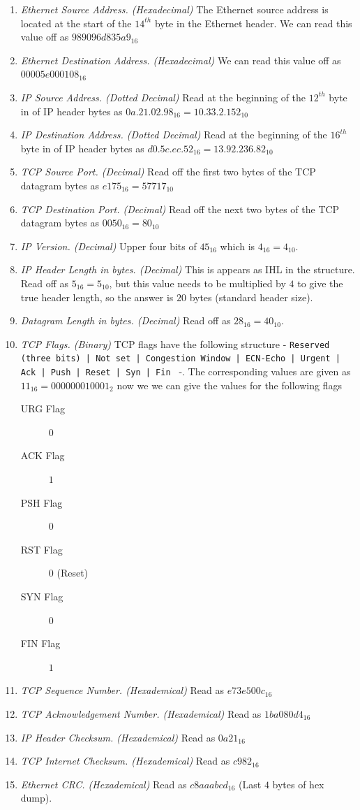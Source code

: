\documentclass{article}
\begin{document}
\begin{enumerate}
    \item {\it Ethernet Source Address. (Hexadecimal)} The Ethernet source address is located at the start of the $14^{th}$ byte in the Ethernet header. We can read this value off as $989096d835a9_{16}$
    \item {\it Ethernet Destination Address. (Hexadecimal)} We can read this value off as $00005e000108_{16}$
    \item {\it IP Source Address. (Dotted Decimal)} Read at the beginning of the $12^{th}$ byte in of IP header bytes as $0a.21.02.98_{16} = 10.33.2.152_{10}$
    \item {\it IP Destination Address. (Dotted Decimal)}  Read at the beginning of the $16^{th}$ byte in of IP header bytes as $d0.5c.ec.52_{16} = 13.92.236.82_{10}$
    \item {\it TCP Source Port. (Decimal)} Read off the first two bytes of the TCP datagram bytes as $e175_{16} = 57717_{10}$
    \item {\it TCP Destination Port. (Decimal)} Read off the next two bytes of the TCP datagram bytes as $0050_{16} = 80_{10}$
    \item {\it IP Version. (Decimal)} Upper four bits of $45_{16}$ which is $4_{16} = 4_{10}$.
    \item {\it IP Header Length in bytes. (Decimal)} This is appears as IHL in the structure. Read off as $5_{16} = 5_{10}$, but this value needs to be multiplied by $4$ to give the true header length, so the answer is $20$ bytes (standard header size).
    \item {\it Datagram Length in bytes. (Decimal)} Read off as $28_{16} = 40_{10}$.
    \item {\it TCP Flags. (Binary)} TCP flags have the following structure - \texttt{Reserved (three bits) | Not set | Congestion Window | ECN-Echo | Urgent | Ack | Push | Reset | Syn | Fin } -. The corresponding values are given as $11_{16} = 000000010001_{2}$ now we we can give the values for the following flags
    \begin{description}
        \item[URG Flag] $0$
        \item[ACK Flag] $1$
        \item[PSH Flag] $0$
        \item[RST Flag] $0$ (Reset)
        \item[SYN Flag] $0$
        \item[FIN Flag] $1$
    \end{description}
    \item {\it TCP Sequence Number. (Hexademical)} Read as $e73e500c_{16}$
    \item {\it TCP Acknowledgement Number. (Hexademical)} Read as $1ba080d4_{16}$
    \item {\it IP Header Checksum. (Hexademical)} Read as $0a21_{16}$
    \item {\it TCP Internet Checksum. (Hexademical)} Read as $c982_{16}$
    \item {\it Ethernet CRC. (Hexademical)} Read as $c8aaabcd_{16}$ (Last $4$ bytes of hex dump).
\end{enumerate}
\end{document}

